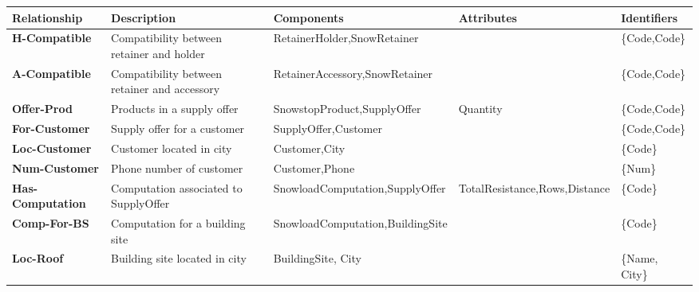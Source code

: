 \begin{table}[H]
  \def\arraystretch{1.25}%
  \centering
  \begin{tabular}{ | m{3cm} | m{2.5cm}| m{3.5cm} | m{2.5cm} | m{2cm} |}
    \hline
    {\textbf{\large Relationship}} & {\textbf{\large Description}} & {\textbf{\large Components}} & {\textbf{\large Attributes}} & {\textbf{\large Identifiers}} \\
    \hline
    \color[HTML]{3531FF} \textbf{H-Compatible} & Compatibility between retainer and holder & RetainerHolder,\newline SnowRetainer & & \{Code,Code\} \\
    \hline
    \color[HTML]{3531FF} \textbf{A-Compatible} & Compatibility between retainer and accessory & RetainerAccessory,\newline SnowRetainer & & \{Code,Code\} \\
    \hline
    \color[HTML]{3531FF} \textbf{Offer-Prod} & Products in a supply offer & SnowstopProduct,\newline SupplyOffer & Quantity  & \{Code,Code\} \\
    \hline
    \color[HTML]{3531FF} \textbf{For-Customer} & Supply offer for a customer & SupplyOffer,\newline Customer &  & \{Code,Code\} \\
    \hline
    \color[HTML]{3531FF} \textbf{Loc-Customer} & Customer located in city & Customer,\newline City &  & \{Code\} \\
    \hline
    \color[HTML]{3531FF} \textbf{Num-Customer} & Phone number of customer & Customer,\newline Phone &  & \{Num\} \\
    \hline
    \color[HTML]{3531FF} \textbf{Has-Computation} & Computation associated to SupplyOffer & SnowloadComputation,\newline SupplyOffer & TotalResistance,\newline Rows,\newline Distance & \{Code\} \\
    \hline
    \color[HTML]{3531FF} \textbf{Comp-For-BS} & Computation for a building site & SnowloadComputation,\newline BuildingSite & & \{Code\} \\
    \hline
    \color[HTML]{3531FF} \textbf{Loc-Roof} & Building site located in city & BuildingSite, City &  & \{Name, City\} \\
    \hline

\end{tabular}
\end{table}
